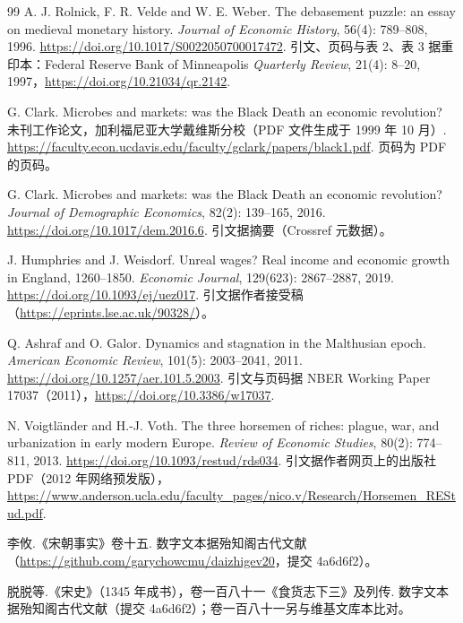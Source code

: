 \begin{thebibliography}{99}
 A. J. Rolnick, F. R. Velde and W. E. Weber. The debasement puzzle: an essay on medieval monetary history. \emph{Journal of Economic History}, 56(4): 789--808, 1996. \url{https://doi.org/10.1017/S0022050700017472}. 引文、页码与表 2、表 3 据重印本：Federal Reserve Bank of Minneapolis \emph{Quarterly Review}, 21(4): 8--20, 1997，\url{https://doi.org/10.21034/qr.2142}.

 G. Clark. Microbes and markets: was the Black Death an economic revolution? 未刊工作论文，加利福尼亚大学戴维斯分校（PDF 文件生成于 1999 年 10 月）. \url{https://faculty.econ.ucdavis.edu/faculty/gclark/papers/black1.pdf}. 页码为 PDF 的页码。

 G. Clark. Microbes and markets: was the Black Death an economic revolution? \emph{Journal of Demographic Economics}, 82(2): 139--165, 2016. \url{https://doi.org/10.1017/dem.2016.6}. 引文据摘要（Crossref 元数据）。

 J. Humphries and J. Weisdorf. Unreal wages? Real income and economic growth in England, 1260--1850. \emph{Economic Journal}, 129(623): 2867--2887, 2019. \url{https://doi.org/10.1093/ej/uez017}. 引文据作者接受稿（\url{https://eprints.lse.ac.uk/90328/}）。

 Q. Ashraf and O. Galor. Dynamics and stagnation in the Malthusian epoch. \emph{American Economic Review}, 101(5): 2003--2041, 2011. \url{https://doi.org/10.1257/aer.101.5.2003}. 引文与页码据 NBER Working Paper 17037（2011），\url{https://doi.org/10.3386/w17037}.

 N. Voigtländer and H.-J. Voth. The three horsemen of riches: plague, war, and urbanization in early modern Europe. \emph{Review of Economic Studies}, 80(2): 774--811, 2013. \url{https://doi.org/10.1093/restud/rds034}. 引文据作者网页上的出版社 PDF（2012 年网络预发版），\url{https://www.anderson.ucla.edu/faculty_pages/nico.v/Research/Horsemen_REStud.pdf}.

 李攸.《宋朝事实》卷十五. 数字文本据殆知阁古代文献（\url{https://github.com/garychowcmu/daizhigev20}，提交 4a6d6f2）。

 脱脱等.《宋史》（1345 年成书），卷一百八十一《食货志下三》及列传. 数字文本据殆知阁古代文献（提交 4a6d6f2）；卷一百八十一另与维基文库本比对。


\end{thebibliography}
